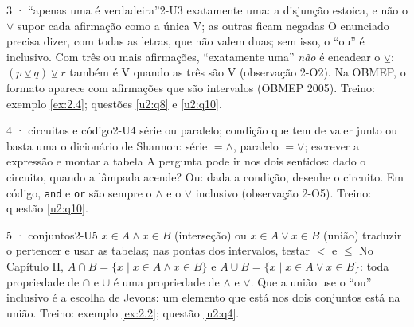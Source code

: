\begin{caso}{3 · \enquote{apenas uma é verdadeira}}{2-U3}
{exatamente uma: a disjunção estoica, e não o $\vee$}
{supor cada afirmação como a única V; as outras ficam negadas}
\reconhecer O enunciado precisa dizer, com todas as letras, que não valem duas; sem isso, o \enquote{ou} é inclusivo. Com três ou mais afirmações, \enquote{exatamente uma} \emph{não} é encadear o $\veebar$: $(p\veebar q)\veebar r$ também é V quando as três são V (observação 2-O2). Na OBMEP, o formato aparece com afirmações que são intervalos (OBMEP 2005). Treino: exemplo \ref{ex:2.4}; questões \ref{u2:q8} e \ref{u2:q10}.
\end{caso}

\begin{caso}{4 · circuitos e código}{2-U4}
{série ou paralelo; condição que tem de valer junto ou basta uma}
{o dicionário de Shannon: série $=\wedge$, paralelo $=\vee$; escrever a expressão e montar a tabela}
\reconhecer A pergunta pode ir nos dois sentidos: dado o circuito, quando a lâmpada acende? Ou: dada a condição, desenhe o circuito. Em código, \texttt{and} e \texttt{or} são sempre o $\wedge$ e o $\vee$ inclusivo (observação 2-O5). Treino: questão \ref{u2:q10}.
\end{caso}

\begin{caso}{5 · conjuntos}{2-U5}
{$x\in A\wedge x\in B$ (interseção) ou $x\in A\vee x\in B$ (união)}
{traduzir o pertencer e usar as tabelas; nas pontas dos intervalos, testar $<$ e $\le$}
\reconhecer No Capítulo II, $A\cap B=\{x\mid x\in A\wedge x\in B\}$ e $A\cup B=\{x\mid x\in A\vee x\in B\}$: toda propriedade de $\cap$ e $\cup$ é uma propriedade de $\wedge$ e $\vee$. Que a união use o \enquote{ou} inclusivo é a escolha de Jevons: um elemento que está nos dois conjuntos está na união. Treino: exemplo \ref{ex:2.2}; questão \ref{u2:q4}.
\end{caso}

